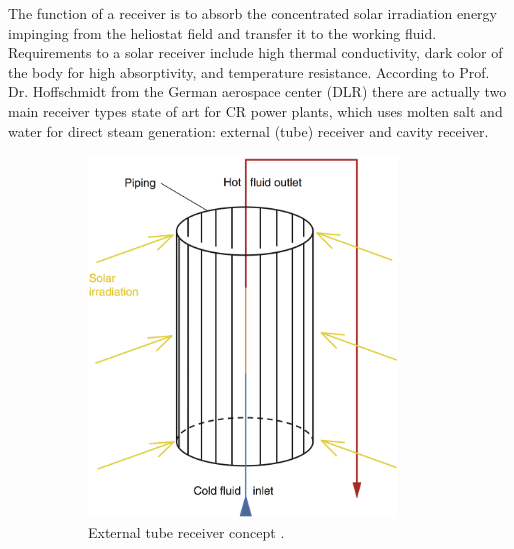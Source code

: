 The function of a receiver is to absorb the concentrated solar irradiation energy impinging from the heliostat field and transfer it to the working fluid. Requirements to a solar receiver include high thermal conductivity, dark color of the body for high absorptivity, and temperature resistance. According to Prof. Dr. Hoffschmidt \cite{Hoffschmidt2014} from the German aerospace center (DLR) there are actually two main receiver types state of art for CR power plants, which uses molten salt and water for direct steam generation: external (tube) receiver and cavity receiver. 
\begin{figure}[!htbp]
        \centering
        \begin{subfigure}[b]{0.5\textwidth}
                \centering
                \includegraphics[width=0.9\textwidth]{FIG/TubeReceiver}
                \caption{External tube receiver concept \cite{Alexopoulos2013}.}\label{TubeReceiver}
        \end{subfigure}%
        ~
        \begin{subfigure}[b]{0.5\textwidth}
                \centering

\end{subfigure}
\end{figure}

